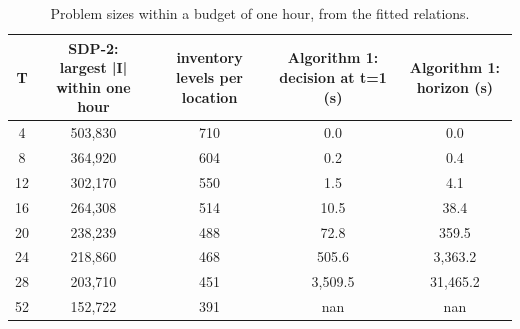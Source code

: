 \begin{table}[H]
\centering
\caption{Problem sizes within a budget of one hour, from the fitted relations.}
\label{tab:test2_Q3_budget}
\begin{tabular}{ccccc}
\toprule
T & SDP-2: largest |I| within one hour & inventory levels per location & Algorithm 1: decision at t=1 (s) & Algorithm 1: horizon (s) \\
\midrule
4 & 503,830 & 710 & 0.0 & 0.0 \\
8 & 364,920 & 604 & 0.2 & 0.4 \\
12 & 302,170 & 550 & 1.5 & 4.1 \\
16 & 264,308 & 514 & 10.5 & 38.4 \\
20 & 238,239 & 488 & 72.8 & 359.5 \\
24 & 218,860 & 468 & 505.6 & 3,363.2 \\
28 & 203,710 & 451 & 3,509.5 & 31,465.2 \\
52 & 152,722 & 391 & nan & nan \\
\bottomrule
\end{tabular}
\end{table}